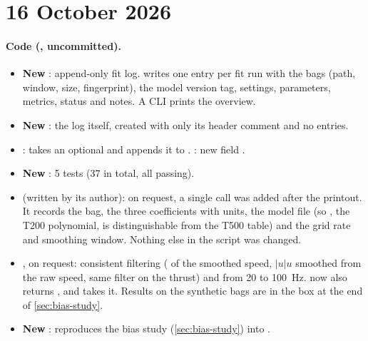 \section*{16 October 2026}

\paragraph{Code (, uncommitted).}
\begin{itemize}
  \item \textbf{New} : append-only fit log.  writes one entry
        per fit run with the bags (path, window, size, fingerprint), the model version tag, settings,
        parameters, metrics, status and notes. A CLI prints the overview.
  \item \textbf{New} : the log itself, created with only its header
        comment and no entries.
  \item {}:  takes an optional  and
        appends it to . : new field .
  \item \textbf{New} : 5 tests (37 in total, all passing).
  \item {} (written by its author): on request, a single
         call was added after the printout. It records the bag, the three
        coefficients with units, the model file (so , the T200 polynomial, is
        distinguishable from the T500 table) and the grid rate and smoothing window. Nothing
        else in the script was changed.
  \item {}, on request: consistent filtering (
        of the smoothed speed, $|u|u$ smoothed from the raw speed, same filter on the thrust) and
         from 20 to \qty{100}{\hertz}.  now also returns ,
        and  takes it. Results on the synthetic bags are in the box at
        the end of \cref{sec:bias-study}.
  \item \textbf{New} : reproduces the bias study
        (\cref{sec:bias-study}) into .
\end{itemize}

